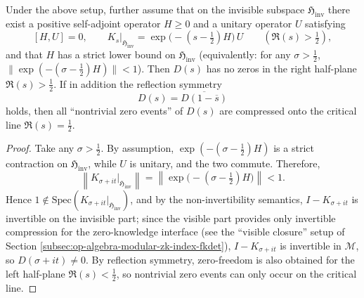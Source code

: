 \begin{theorem}\label{thm:op-algebra-hzom-commuting-polar-forces-critical-line}
Under the above setup, further assume that on the invisible subspace \(\mathfrak{H}_{\mathrm{inv}}\) there exist a positive self-adjoint operator \(H\ge 0\) and a unitary operator \(U\) satisfying
\[
[H,U]=0,
\qquad
K_s\big|_{\mathfrak{H}_{\mathrm{inv}}}
=\exp\!\bigl(-(s-\tfrac12)H\bigr)\,U\qquad(\Re(s)>\tfrac12),
\]
and that \(H\) has a strict lower bound on \(\mathfrak{H}_{\mathrm{inv}}\) (equivalently: for any \(\sigma>\tfrac12\), \(\|\exp(-(\sigma-\tfrac12)H)\|<1\)).
Then \(D(s)\) has no zeros in the right half-plane \(\Re(s)>\tfrac12\).
If in addition the reflection symmetry
\[
\boxed{\ D(s)=\overline{D(1-\overline{s})}\ }
\]
holds, then all ``nontrivial zero events'' of \(D(s)\) are compressed onto the critical line \(\Re(s)=\tfrac12\).
\end{theorem}
\begin{proof}
Take any \(\sigma>\tfrac12\). By assumption, \(\exp(-(\sigma-\tfrac12)H)\) is a strict contraction on \(\mathfrak{H}_{\mathrm{inv}}\), while \(U\) is unitary, and the two commute.
Therefore,
\[
\left\|K_{\sigma+it}\big|_{\mathfrak{H}_{\mathrm{inv}}}\right\|
=\left\|\exp\!\bigl(-(\sigma-\tfrac12)H\bigr)\right\|
<1.
\]
Hence \(1\notin\mathrm{Spec}(K_{\sigma+it}|_{\mathfrak{H}_{\mathrm{inv}}})\), and by the non-invertibility semantics, \(I-K_{\sigma+it}\) is invertible on the invisible part;
since the visible part provides only invertible compression for the zero-knowledge interface (see the ``visible closure'' setup of Section \ref{subsec:op-algebra-modular-zk-index-fkdet}), \(I-K_{\sigma+it}\) is invertible in \(\mathcal{M}\), so \(D(\sigma+it)\neq 0\).
By reflection symmetry, zero-freedom is also obtained for the left half-plane \(\Re(s)<\tfrac12\), so nontrivial zero events can only occur on the critical line. \qedhere
\end{proof}

